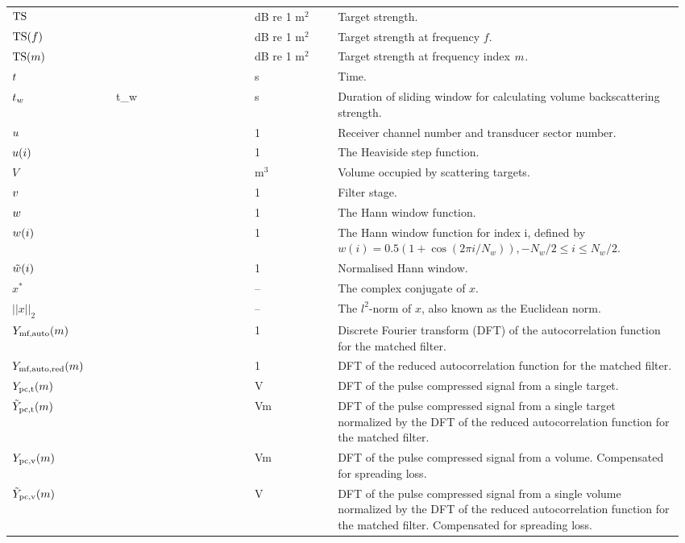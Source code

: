 \documentclass[12pt,a4paper]{article}
\renewcommand{\code}[1]{\texttt{\detokenize{#1}}}
\begin{document}
\begin{longtable}{p{0.15\linewidth} p{0.20\linewidth} p{0.12\linewidth} p{0.5\linewidth} }
$\textrm{TS}$ & & dB re 1 $\textrm{m}^2$ & Target strength.\\
$\textrm{TS}(f)$ & & dB re 1 $\textrm{m}^2$ & Target strength at frequency $f$.\\
$\textrm{TS}(m)$ & \code{TS_m} & dB re 1 $\textrm{m}^{2}$ & Target strength at frequency index $m$.\\

$t$ & & s &  Time.\\
$t_w$ & t\_w & s & Duration of sliding window for calculating volume backscattering strength.\\

$u$ & & 1 & Receiver channel number and transducer sector number.\\
$u(i)$ & & 1 & The Heaviside step function. \\
$V$ & & $\textrm{m}^3$ & Volume occupied by scattering targets.\\
$v$ & & 1 & Filter stage.\\

$w$ & & 1 & The Hann window function.\\
$w(i)$ & & 1 & The Hann window function for index i, defined by $w(i) = 0.5(1+\cos (2\pi i /N_w)), -N_w/2 \leq i \leq N_w/2$.\\
$\tilde{w}(i)$ & & 1 & Normalised Hann window.\\

$x^*$ & & -- & The complex conjugate of $x$.\\
$||x||_2$ & & -- & The $l^2$-norm of $x$, also known as the Euclidean norm.\\

$Y_{\textrm{mf,auto}}(m)$ & & 1 & Discrete Fourier transform (DFT) of the autocorrelation function for the matched filter.\\
$Y_{\textrm{mf,auto,red}}(m)$ &  & 1 & DFT of the reduced autocorrelation function for the matched filter.\\
$Y_{\textrm{pc,t}}(m)$ & & V & DFT of the pulse compressed signal from a single target.\\
$\tilde{Y}_{\textrm{pc,t}}(m)$ & & Vm & DFT of the pulse compressed signal from a single target 
normalized by the DFT of the reduced autocorrelation function for the matched filter.\\
$Y_{\textrm{pc,v}}(m)$ & & Vm & DFT of the pulse compressed signal from a volume. Compensated for spreading loss.\\
$\tilde{Y}_{\textrm{pc,v}}(m)$ & & V & DFT of the pulse compressed signal from a single volume normalized by the DFT of the reduced autocorrelation function for the matched filter.  Compensated for spreading loss.\\


\end{longtable}
\end{document}
